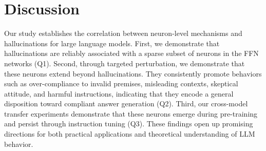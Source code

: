 \documentclass[dvipsnames]{article}
\begin{document}



\section{Discussion}
\label{Discussion}


Our study establishes the correlation between neuron-level mechanisms and hallucinations for large language models. First, we demonstrate that hallucinations are reliably associated with a sparse subset of neurons in the FFN networks (Q1). Second, through targeted perturbation, we demonstrate that these neurons extend beyond hallucinations. They consistently promote behaviors such as over-compliance to invalid premises, misleading contexts, skeptical attitude, and harmful instructions, indicating that they encode a general disposition toward compliant answer generation (Q2). Third, our cross-model transfer experiments demonstrate that these neurons emerge during pre-training and persist through instruction tuning (Q3).
These findings open up promising directions for both practical applications and theoretical understanding of LLM behavior. 
\end{document}
